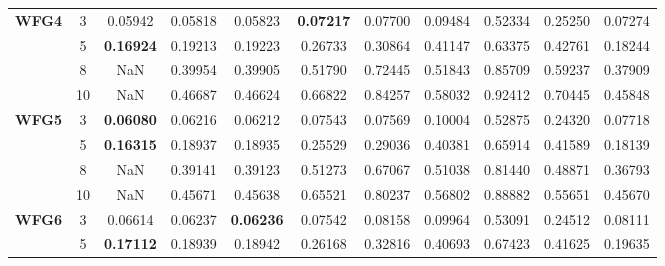 \documentclass[conference]{IEEEtran}
\begin{document}
\begin{table*}[!htb]
\begin{tabular}{|c|c|c|c|c|c|c|c|c|c|c|}
		\multirow{4}{*}{\textbf{WFG4}}  & 3          & 0.05942          & 0.05818           & 0.05823               & \textbf{0.07217} & 0.07700             & 0.09484             & 0.52334            & 0.25250              & 0.07274          \\ \cline{2-11} 
		& 5          & \textbf{0.16924} & 0.19213           & 0.19223               & 0.26733          & 0.30864             & 0.41147             & 0.63375            & 0.42761              & 0.18244          \\ \cline{2-11} 
		& 8          & NaN              & 0.39954           & 0.39905               & 0.51790          & 0.72445             & 0.51843             & 0.85709            & 0.59237              & 0.37909          \\ \cline{2-11} 
		& 10         & NaN              & 0.46687           & 0.46624               & 0.66822          & 0.84257             & 0.58032             & 0.92412            & 0.70445              & 0.45848          \\ \hline
		\multirow{4}{*}{\textbf{WFG5}}  & 3          & \textbf{0.06080} & 0.06216           & 0.06212               & 0.07543          & 0.07569             & 0.10004             & 0.52875            & 0.24320              & 0.07718          \\ \cline{2-11} 
		& 5          & \textbf{0.16315} & 0.18937           & 0.18935               & 0.25529          & 0.29036             & 0.40381             & 0.65914            & 0.41589              & 0.18139          \\ \cline{2-11} 
		& 8          & NaN              & 0.39141           & 0.39123               & 0.51273          & 0.67067             & 0.51038             & 0.81440            & 0.48871              & 0.36793          \\ \cline{2-11} 
		& 10         & NaN              & 0.45671           & 0.45638               & 0.65521          & 0.80237             & 0.56802             & 0.88882            & 0.55651              & 0.45670          \\ \hline
		\multirow{4}{*}{\textbf{WFG6}}  & 3          & 0.06614          & 0.06237           & \textbf{0.06236}      & 0.07542          & 0.08158             & 0.09964             & 0.53091            & 0.24512              & 0.08111          \\ \cline{2-11} 
		& 5          & \textbf{0.17112} & 0.18939           & 0.18942               & 0.26168          & 0.32816             & 0.40693             & 0.67423            & 0.41625              & 0.19635          \\ \cline{2-11} 

\end{tabular}
\end{table*}
\end{document}
